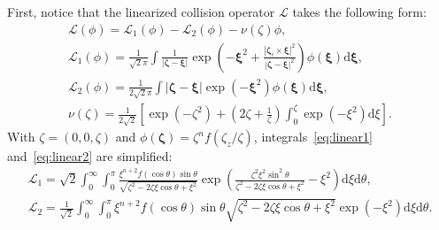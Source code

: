 \documentclass[]{elsarticle} %
\newcommand{\dd}{\mathrm{d}}
\newcommand{\dxi}{\boldsymbol{\dd\xi}}
\newcommand{\bzeta}{\boldsymbol{\zeta}}
\newcommand{\bxi}{\boldsymbol{\xi}}
\begin{document}
First, notice that the linearized collision operator \(\mathcal{L}\) takes the following form:
\begin{gather}
    \mathcal{L}(\phi) = \mathcal{L}_1(\phi) - \mathcal{L}_2(\phi) - \nu(\zeta)\phi, \label{eq:linear_canonic}\\[6pt]
    \mathcal{L}_1(\phi) = \frac1{\sqrt2\pi} \int \frac1{|\bzeta-\bxi|}
        \exp\left(-\bxi^2 + \frac{|\bzeta_i\times\bxi|^2}{|\bzeta-\bxi|^2}\right) \phi(\bxi) \dxi, \label{eq:linear1}\\
    \mathcal{L}_2(\phi) = \frac1{2\sqrt2\pi} \int |\bzeta-\bxi|\exp\left(-\bxi^2\right) \phi(\bxi) \dxi, \label{eq:linear2}\\
    \nu(\zeta) = \frac1{2\sqrt2}\left[ \exp\left(-\zeta^2\right) + \left(2\zeta+\frac1\zeta\right)
        \int_0^\zeta\exp\left(-\xi^2\right)\dd\xi \right]. \label{eq:linear_nu}
\end{gather}
With \(\zeta=(0,0,\zeta)\) and \(\phi(\bzeta) = \zeta^n f(\zeta_z/\zeta)\),
integrals~\eqref{eq:linear1} and~\eqref{eq:linear2} are simplified:
\begin{gather}
    \mathcal{L}_1 = \sqrt2 \int_0^\infty \int_0^\pi
        \frac{\xi^{n+2}f(\cos\theta)\sin\theta}{\sqrt{\zeta^2-2\zeta\xi\cos\theta+\xi^2}}
        \exp\left( \frac{\zeta^2\xi^2\sin^2\theta}{\zeta^2-2\zeta\xi\cos\theta+\xi^2} -\xi^2 \right)
        \dd\xi\dd\theta, \label{eq:linear1_sph}\\
    \mathcal{L}_2 = \frac1{\sqrt2} \int_0^\infty \int_0^\pi
        \xi^{n+2}f(\cos\theta)\sin\theta\sqrt{\zeta^2-2\zeta\xi\cos\theta+\xi^2}
        \exp\left(-\xi^2\right) \dd\xi\dd\theta. \label{eq:linear2_sph}
\end{gather}
\end{document}
